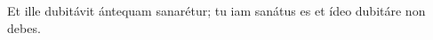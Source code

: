 {\noindent Et ille dubitávit ántequam sanarétur; tu iam sanátus es et ídeo dubitáre non debes.}
\newcommand{\responsoriumiii}{\pars{Responsorium 3.} \scriptura{\Rbardot{} Ps. 76, 20 \Vbardot{} ibid., 19; \textbf{H159}}

\vspace{-5mm}

\responsorium{II}{temporalia/resp-inmariviatua-CROCHU-cumdox.gtex}{}}


